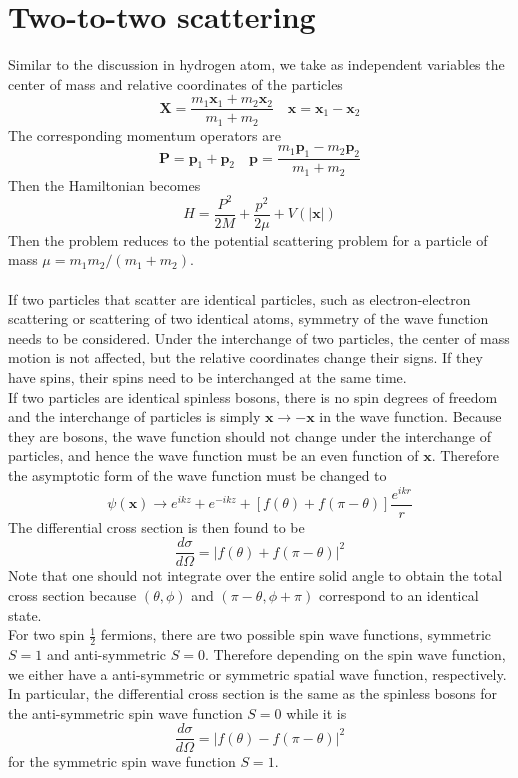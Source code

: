 \section{Two-to-two scattering}
Similar to the discussion in hydrogen atom, we take as independent variables the center of mass and relative coordinates of the particles
\[\bm{X} = \frac{m_1\bm{x}_1 + m_2\bm{x}_2}{m_1+m_2} \quad \bm{x} = \bm{x}_1-\bm{x}_2\]
The corresponding momentum operators are
\[\bm{P} = \bm{p}_1 + \bm{p}_2 \quad \bm{p} = \frac{m_1\bm{p}_1-m_2\bm{p}_2}{m_1 + m_2}\]
Then the Hamiltonian becomes
\[H = \frac{P^2}{2M} + \frac{p^2}{2\mu} + V(|\bm{x}|)\]
Then the problem reduces to the potential scattering problem for a particle of mass $\mu = m_1m_2/(m_1+m_2)$.
\\ \\
If two particles that scatter are identical particles, such as electron-electron scattering or scattering of two identical atoms, symmetry of the wave function needs to be considered.
Under the interchange of two particles, the center of mass motion is not affected, but the relative coordinates change their signs. If they have spins, their spins need to be interchanged at the same time.
\\
If two particles are identical spinless bosons, there is no spin degrees of freedom and the interchange of particles is simply $\bm{x} \to -\bm{x}$ in the wave function. 
Because they are bosons, the wave function should not change under the interchange of particles, and hence the wave function must be an even function of $\bm{x}$. 
Therefore the asymptotic form of the wave function must be changed to
\[\psi(\bm{x}) \to e^{ikz} + e^{-ikz} + [f(\theta) + f(\pi - \theta)] \frac{e^{ikr}}{r}\]
The differential cross section is then found to be
\[\frac{d\sigma}{d\Omega} = |f(\theta)+f(\pi-\theta)|^2\]
Note that one should not integrate over the entire solid angle to obtain the total cross section because $(\theta,\phi)$ and $(\pi - \theta,\phi+\pi)$ correspond to an identical state.
\\
For two spin $\frac{1}{2}$ fermions, there are two possible spin wave functions, symmetric $S = 1$ and anti-symmetric $S = 0$.
Therefore depending on the spin wave function, we either have a anti-symmetric or symmetric spatial wave function, respectively. In particular, the differential cross section is the same as the spinless bosons for the anti-symmetric spin wave function $S= 0 $ while it is
\[\frac{d\sigma}{d\Omega} = |f(\theta) - f(\pi-\theta)|^2\]
for the symmetric spin wave function $S = 1$.

